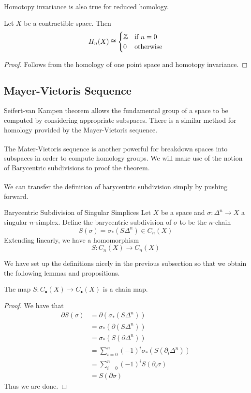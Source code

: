 \documentclass[a4paper]{article}
\begin{document}
Homotopy invariance is also true for reduced homology. 

\begin{eg}{}{} Let $X$ be a contractible space. Then $$H_n(X)\cong\begin{cases}
\mathbb{Z} & \text{if } n=0\\
0 & \text{otherwise}
\end{cases}$$ \tcbline
\begin{proof}
Follows from the homology of one point space and homotopy invariance. 
\end{proof}
\end{eg}

\subsection{Mayer-Vietoris Sequence}
Seifert-van Kampen theorem allows the fundamental group of a space to be computed by considering appropriate subspaces. There is a similar method for homology provided by the Mayer-Vietoris sequence. \\~\\

The Mater-Vietoris sequence is another powerful for breakdown spaces into subspaces in order to compute homology groups. We will make use of the notion of Barycentric subdivisions to proof the theorem. \\~\\

We can transfer the definition of barycentric subdivision simply by pushing forward. 

\begin{defn}{Barycentric Subdivision of Singular Simplices}{} Let $X$ be a space and $\sigma:\Delta^n\to X$ a singular $n$-simplex. Define the barycentric subdivision of $\sigma$ to be the $n$-chain $$S(\sigma)=\sigma_\ast(S\Delta^n)\in C_n(X)$$ Extending linearly, we have a homomorphism $$S:C_n(X)\to C_n(X)$$
\end{defn}

We have set up the definitions nicely in the previous subsection so that we obtain the following lemmas and propositions. 

\begin{lmm}{}{} The map $S:C_\bullet(X)\to C_\bullet(X)$ is a chain map. \tcbline
\begin{proof}
We have that 
\begin{align*}
\partial S(\sigma)&=\partial(\sigma_\ast(S\Delta^n))\\
&=\sigma_\ast(\partial(S\Delta^n))\tag{$\sigma_\ast$ is a chain map}\\
&=\sigma_\ast(S(\partial\Delta^n))\tag{Lemma 4.2.4}\\
&=\sum_{i=0}^n(-1)^i\sigma_\ast(S(\partial_i\Delta^n))\\
&=\sum_{i=0}^n(-1)^iS(\partial_i\sigma)\tag{Definition of $S$}\\
&=S(\partial\sigma)
\end{align*}
Thus we are done. 
\end{proof}
\end{lmm}
\end{document}
